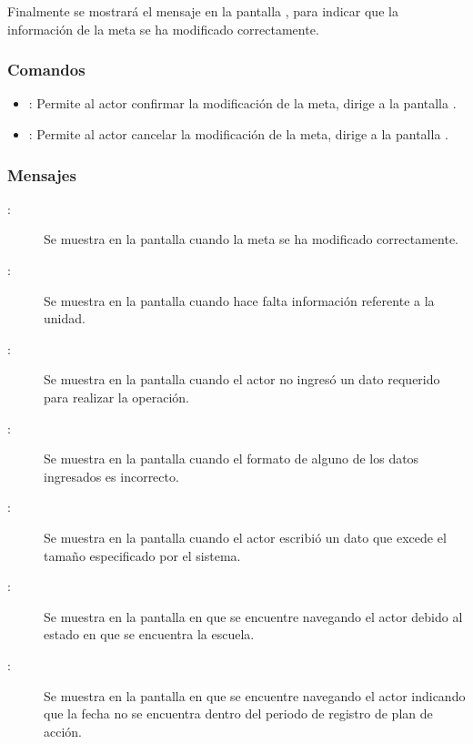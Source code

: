   Finalmente se mostrará el mensaje  en la pantalla , para indicar que la información de la
  meta se ha modificado correctamente.
    
\subsubsection{Comandos}
\begin{itemize}
	\item {}: Permite al actor confirmar la modificación de la meta, dirige a la pantalla .
	\item {}: Permite al actor cancelar la modificación de la meta, dirige a la pantalla .
\end{itemize}


\subsubsection{Mensajes}

\begin{description}
	\item[:] Se muestra en la pantalla  cuando la meta se ha modificado correctamente.
	\item[:] Se muestra en la pantalla  cuando hace falta información referente a la unidad.
	\item[:] Se muestra en la pantalla  cuando el actor no ingresó un dato requerido para realizar la operación.
	\item[:] Se muestra en la pantalla  cuando el formato de alguno de los datos ingresados es incorrecto.
	\item[:] Se muestra en la pantalla  cuando el actor escribió un dato que excede el tamaño especificado por el sistema.
	\item[:] Se muestra en la pantalla en que se encuentre navegando el actor debido al estado en que se encuentra la escuela.	
	\item[:] Se muestra en la pantalla en que se encuentre navegando el actor indicando que la fecha no se encuentra dentro del periodo de registro de plan de acción.
\end{description}
